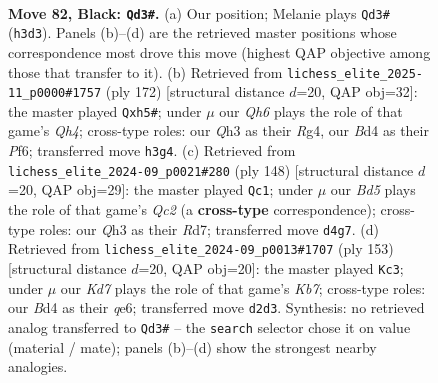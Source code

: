 \documentclass[11pt]{article}
\begin{document}
\clearpage

\begin{figure}[p]\centering
\begin{subfigure}{0.46\textwidth}\centering
\resizebox{\linewidth}{!}{%
\newchessgame
\chessboard[
  setfen={8/8/8/8/3b4/1p5q/3k2B1/5K2 b - - 7 82},
  showmover=false,
  pgfstyle=straightmove, color=movearrow, markmove={h3-d3}
]}
\caption{}
\end{subfigure}\hfill
\begin{subfigure}{0.46\textwidth}\centering
\resizebox{\linewidth}{!}{%
\newchessgame
\chessboard[
  setfen={8/7k/5P2/2K4b/6RQ/8/8/8 w - - 5 87},
  showmover=false,
  pgfstyle=straightmove, color=movearrow, markmove={h4-h5}
]}
\caption{}
\end{subfigure}
\\[4pt]
\begin{subfigure}{0.46\textwidth}\centering
\resizebox{\linewidth}{!}{%
\newchessgame
\chessboard[
  setfen={8/3R4/3b4/3k1K2/8/8/2Q5/8 w - - 7 75},
  showmover=false,
  pgfstyle=straightmove, color=movearrow, markmove={c2-c1}
]}
\caption{}
\end{subfigure}\hfill
\begin{subfigure}{0.46\textwidth}\centering
\resizebox{\linewidth}{!}{%
\newchessgame
\chessboard[
  setfen={8/8/4Q3/3B4/8/1q6/1k3K2/8 b - - 38 77},
  showmover=false,
  pgfstyle=straightmove, color=movearrow, markmove={b2-c3}
]}
\caption{}
\end{subfigure}
\caption{\textbf{Move 82, Black: \texttt{Qd3\#}.} (a) Our position; Melanie plays \texttt{Qd3\#} (\texttt{h3d3}). Panels (b)--(d) are the retrieved master positions whose correspondence most drove this move (highest QAP objective among those that transfer to it). (b) Retrieved from \texttt{lichess\_elite\_2025-11\_p0000\#1757} (ply 172) [structural distance $d$=20, QAP obj=32]: the master played \texttt{Qxh5\#}; under $\mu$ our \emph{Qh6} plays the role of that game's \emph{Qh4}; cross-type roles: our \emph{Q}h3 as their \emph{R}g4, our \emph{B}d4 as their \emph{P}f6; transferred move \texttt{h3g4}. (c) Retrieved from \texttt{lichess\_elite\_2024-09\_p0021\#280} (ply 148) [structural distance $d$=20, QAP obj=29]: the master played \texttt{Qc1}; under $\mu$ our \emph{Bd5} plays the role of that game's \emph{Qc2} (a \textbf{cross-type} correspondence); cross-type roles: our \emph{Q}h3 as their \emph{R}d7; transferred move \texttt{d4g7}. (d) Retrieved from \texttt{lichess\_elite\_2024-09\_p0013\#1707} (ply 153) [structural distance $d$=20, QAP obj=20]: the master played \texttt{Kc3}; under $\mu$ our \emph{Kd7} plays the role of that game's \emph{Kb7}; cross-type roles: our \emph{B}d4 as their \emph{q}e6; transferred move \texttt{d2d3}. Synthesis: no retrieved analog transferred to \texttt{Qd3\#} -- the \texttt{search} selector chose it on value (material / mate); panels (b)--(d) show the strongest nearby analogies.}
\label{fig:thought-m163}
\end{figure}
\end{document}
